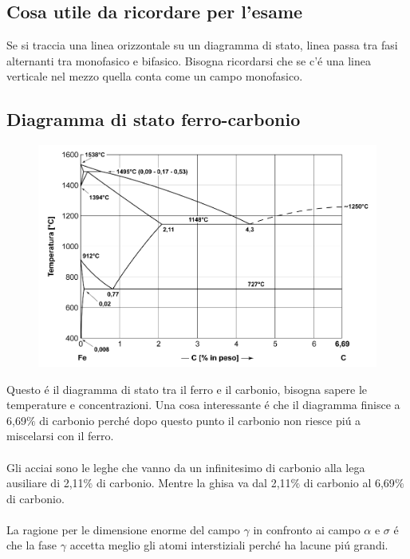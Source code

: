 \documentclass{article}
\begin{document}
{        \subsection{Cosa utile da ricordare per l'esame}
            Se si traccia una linea orizzontale su un diagramma di stato, linea passa tra fasi alternanti tra monofasico e bifasico. Bisogna ricordarsi che se c'\'e una linea verticale nel mezzo quella conta come un campo monofasico.
        \subsection{Diagramma di stato ferro-carbonio}
            \begin{figure}[h!]
                \centering
                \includegraphics[width=.85\linewidth]{L12 - Diagramma Fe-C non simplificato.png}
            \end{figure}
            Questo \'e il diagramma di stato tra il ferro e il carbonio, bisogna sapere le temperature e concentrazioni. Una cosa interessante \'e che il diagramma finisce a 6,69$\%$ di carbonio perch\'e dopo questo punto il carbonio non riesce pi\'u a miscelarsi con il ferro.\\ \\
            Gli acciai sono le leghe che vanno da un infinitesimo di carbonio alla lega ausiliare di 2,11$\%$ di carbonio. Mentre la ghisa va dal 2,11$\%$ di carbonio al 6,69$\%$ di carbonio.\\ \\
            La ragione per le dimensione enorme del campo $\gamma$ in confronto ai campo $\alpha$ e $\sigma$ \'e che la fase $\gamma$ accetta meglio gli atomi interstiziali perch\'e ha lacune pi\'u grandi. 
}
\end{document}
